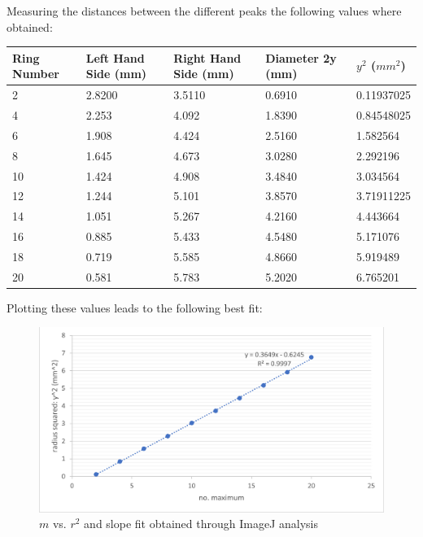 \documentclass[12pt]{article}
\begin{document}
Measuring the distances between the different peaks the following values where obtained:

\begin{table}[H]
  \begin{tabular}{lllll}
  \hline
  Ring Number & Left Hand Side (mm) & Right Hand Side (mm) & Diameter 2y (mm) & $y^2$ ($mm^2$) \\
  \hline
  2           & 2.8200              & 3.5110               & 0.6910           & 0.11937025                                   \\
  4           & 2.253               & 4.092                & 1.8390           & 0.84548025                                   \\
  6           & 1.908               & 4.424                & 2.5160           & 1.582564                                     \\
  8           & 1.645               & 4.673                & 3.0280           & 2.292196                                     \\
  10          & 1.424               & 4.908                & 3.4840           & 3.034564                                     \\
  12          & 1.244               & 5.101                & 3.8570           & 3.71911225                                   \\
  14          & 1.051               & 5.267                & 4.2160           & 4.443664                                     \\
  16          & 0.885               & 5.433                & 4.5480           & 5.171076                                     \\
  18          & 0.719               & 5.585                & 4.8660           & 5.919489                                     \\
  20          & 0.581               & 5.783                & 5.2020           & 6.765201                                     \\
  \end{tabular}
\end{table}

Plotting these values leads to the following best fit:

\begin{figure}[H]
  \centering
  \includegraphics[width=16cm]{./images/imagej_graph.png}
  \caption{$m$ vs. $r^2$ and slope fit obtained through ImageJ analysis}
  \label{fig:result_imagej}
\end{figure}
\end{document}
